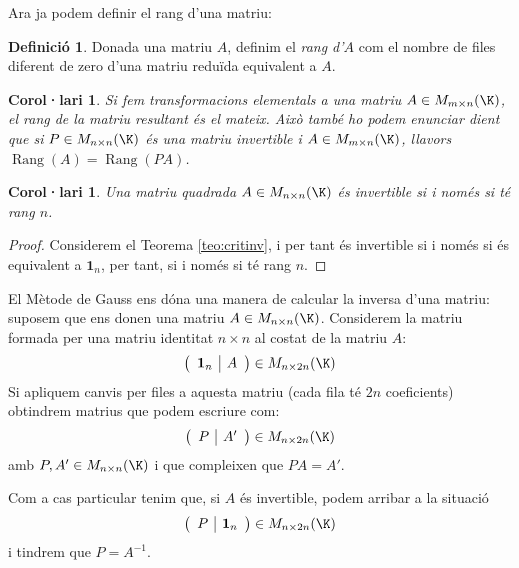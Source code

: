 \documentclass[a4paper,12pt,twoside]{article}
\newcommand{\1}{\mathbf{1}}
\newcommand{\0}{\mathbf{0}}
\DeclareMathOperator{\Rang}{Rang}
\newtheorem{corollari}[teorema]{Corol·lari}
\theoremstyle{definition}
\newtheorem{definicio}[teorema]{Definició}
\theoremstyle{remark}
\begin{document}
Ara ja podem definir el rang d'una matriu:
\begin{definicio}
Donada una matriu $A$, definim el \emph{rang d'$A$} com el nombre de files diferent de zero d'una matriu reduïda equivalent a $A$.
\end{definicio}
\begin{corollari}
	Si fem transformacions elementals a una matriu $A\in M_{m\times n}(\K)$, el rang de la matriu resultant és el mateix. Això també ho podem enunciar dient que si $P\in M_{n\times n}(\K)$ és una matriu invertible i $A\in M_{m\times n}(\K)$, llavors $\Rang(A)=\Rang(PA)$.
\end{corollari}
\begin{corollari}
	Una matriu quadrada $A\in M_{n\times n}(\K)$ és invertible si i només si té rang $n$.
\end{corollari}
\begin{proof}
	Considerem el Teorema \ref{teo:critinv}, i per tant és invertible si i només si és equivalent a $\1_n$, per tant, si i només si té rang $n$.
\end{proof}
El Mètode de Gauss ens dóna una manera de calcular la inversa d'una matriu: suposem que ens donen una matriu $A \in M_{n\times n}(\K)$. Considerem la matriu formada per una matriu identitat $n\times n$ al costat de la matriu $A$:
$$
\left(\begin{array}{c|c}\1_n & A \end{array}\right) \in M_{n\times 2n}(\K)
$$
Si apliquem canvis per files a aquesta matriu (cada fila té $2n$ coeficients) obtindrem matrius que podem escriure com:
$$
\left(\begin{array}{c|c}P & A' \end{array}\right) \in M_{n\times 2n}(\K)
$$
amb $P,A'\in M_{n\times n}(\K)$ i que compleixen que $PA=A'$.

Com a cas particular tenim que, si $A$ és invertible, podem arribar a la situació
\begin{equation}\label{eq:inversa}
\left(\begin{array}{c|c}P & \1_n \end{array}\right) \in M_{n\times 2n}(\K)
\end{equation}
i tindrem que $P=A^{-1}$.
\end{document}
